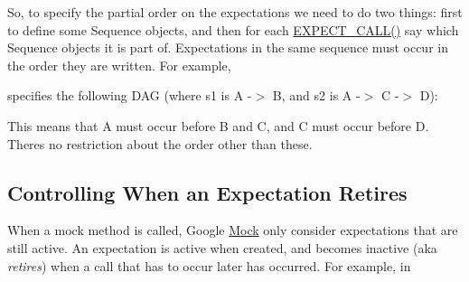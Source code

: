So, to specify the partial order on the expectations we need to do two things\+: first to define some {\ttfamily Sequence} objects, and then for each {\ttfamily \mbox{\hyperlink{gmock-spec-builders_8h_a535a6156de72c1a2e25a127e38ee5232}{E\+X\+P\+E\+C\+T\+\_\+\+C\+A\+L\+L()}}} say which {\ttfamily Sequence} objects it is part of. Expectations in the same sequence must occur in the order they are written. For example,


\begin{DoxyCode}{0}
\DoxyCodeLine{}
\DoxyCodeLine{}
\end{DoxyCode}


specifies the following D\+AG (where {\ttfamily s1} is {\ttfamily A -\/$>$ B}, and {\ttfamily s2} is {\ttfamily A -\/$>$ C -\/$>$ D})\+:


\begin{DoxyCode}{0}
\DoxyCodeLine{     |}
\DoxyCodeLine{     |}
\end{DoxyCode}


This means that A must occur before B and C, and C must occur before D. There\textquotesingle{}s no restriction about the order other than these.

\subsection*{Controlling When an Expectation Retires}

When a mock method is called, Google \mbox{\hyperlink{classMock}{Mock}} only consider expectations that are still active. An expectation is active when created, and becomes inactive (aka {\itshape retires}) when a call that has to occur later has occurred. For example, in


\begin{DoxyCode}{0}
\DoxyCodeLine{}
\DoxyCodeLine{}
\end{DoxyCode}



